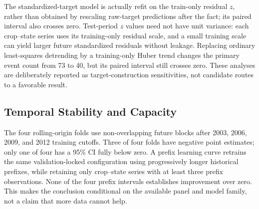 \documentclass[conference]{IEEEtran}
\renewcommand{\arraystretch}{0.98}
\begin{document}
\begin{table}[t]
\centering
\caption{Target and model sensitivity. History 3 is the primary technical minimum.
RMSE / zero gives model and zero-baseline RMSE. *Sensitivity PASS is evaluated on a
different eligible population and cannot alter the primary Gate A decision. History 8
and History 10 have identical eligible rows/targets; their maximum prediction
difference is $1.11\times10^{-16}$, so displayed metrics coincide.}
\label{tab:sensitivity}
\footnotesize
\renewcommand{\arraystretch}{1.05}

\end{table}

\begin{table}[t]
\centering
\caption{Paired resampling sensitivity on the locked 333-row population. The
number of clusters is a resampling property, never a row count.}
\label{tab:resampling}
\scriptsize
\resizebox{\textwidth}{!}{}
\end{table}

The standardized-target model is actually refit on the train-only residual $z$,
rather than obtained by rescaling raw-target predictions after the fact; its paired
interval also crosses zero. Test-period $z$ values need not have unit variance:
each crop--state series uses its training-only residual scale, and a small training
scale can yield larger future standardized residuals without leakage. Replacing ordinary least-squares detrending by a
training-only Huber trend changes the primary event count from 73 to 40, but its
paired interval still crosses zero. These analyses are deliberately reported as
target-construction sensitivities, not candidate routes to a favorable result.

\subsection{Temporal Stability and Capacity}
The four rolling-origin folds use non-overlapping future blocks after 2003, 2006,
2009, and 2012 training cutoffs. Three of four folds have negative point estimates;
only one of four has a 95\% CI fully below zero. A prefix learning curve retrains the same validation-locked
configuration using progressively longer historical prefixes, while retaining only
crop--state series with at least three prefix observations. None of the four
prefix intervals establishes improvement over zero. This makes the conclusion
conditional on the available panel and model family, not a claim that more data
cannot help.
\end{document}
